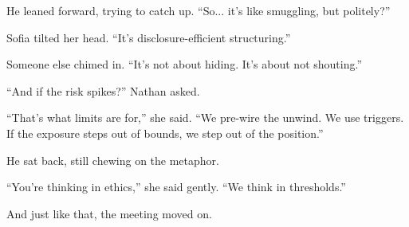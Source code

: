 He leaned forward, trying to catch up. “So... it’s like smuggling, but politely?”

Sofia tilted her head. “It’s disclosure-efficient structuring.”

Someone else chimed in. “It’s not about hiding. It’s about not shouting.”

“And if the risk spikes?” Nathan asked.

“That’s what limits are for,” she said. “We pre-wire the unwind. We use triggers. If the exposure 
steps out of bounds, we step out of the position.”

He sat back, still chewing on the metaphor.

“You’re thinking in ethics,” she said gently. “We think in thresholds.”

And just like that, the meeting moved on.

\medskip


\medskip

